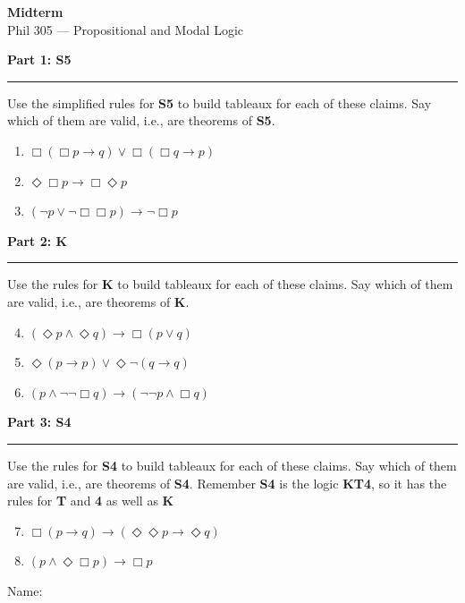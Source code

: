 \documentclass[12pt]{article}
\newcommand{\ruleheader}[1]{\medskip\noindent\textbf{\large #1}\par\smallskip\hrule\smallskip}
\begin{document}
\begin{center}
{\LARGE\bfseries Midterm}\\[4pt]
{\large Phil 305 --- Propositional and Modal Logic}
\end{center}

\ruleheader{Part 1: S5}

Use the simplified rules for \textbf{S5} to build tableaux for each of these claims. Say which of them are valid, i.e., are theorems of \textbf{S5}.

{\Large
\begin{enumerate}
\item $\Box(\Box p \rightarrow q) \vee \Box(\Box q \rightarrow p)$
\item $\Diamond \Box p \rightarrow \Box \Diamond p$
\item $(\neg p \vee \neg \Box \Box p) \rightarrow \neg \Box p$
\end{enumerate}
}

\ruleheader{Part 2: K}

Use the rules for \textbf{K} to build tableaux for each of these claims. Say which of them are valid, i.e., are theorems of \textbf{K}.

{\Large
\begin{enumerate}
\setcounter{enumi}{3}
\item $(\Diamond p \wedge \Diamond q) \rightarrow \Box(p \vee q)$
\item $\Diamond (p \rightarrow p) \vee \Diamond \neg (q \rightarrow q)$
\item $(p \wedge \neg \neg \Box q) \rightarrow (\neg \neg p \wedge \Box q)$
\end{enumerate}
}

\ruleheader{Part 3: S4}

Use the rules for \textbf{S4} to build tableaux for each of these claims. Say which of them are valid, i.e., are theorems of \textbf{S4}. Remember \textbf{S4} is the logic \textbf{KT4}, so it has the rules for \textbf{T} and \textbf{4} as well as \textbf{K}

{\Large
\begin{enumerate}
\setcounter{enumi}{6}
\item $\Box(p \rightarrow q) \rightarrow (\Diamond \Diamond p \rightarrow \Diamond q)$
\item $(p \wedge \Diamond \Box p) \rightarrow \Box p$
\end{enumerate}
}

\newpage
\huge{
  Name: \dotfill
}
\end{document}
